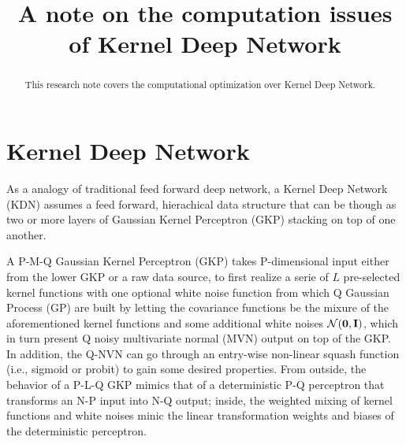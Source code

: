 \documentclass[11pt]{article}
\newcommand{\bs}{\boldsymbol}
\begin{document}
\title{A note on the computation issues of Kernel Deep Network}
\maketitle
{}

\clearpage
\begin{abstract}
  This research note covers the computational optimization over Kernel Deep Network.
\end{abstract}
\clearpage

\section{Kernel Deep Network}
As a analogy of traditional feed forward deep network, a Kernel Deep Network (KDN) assumes a feed forward, hierachical data structure that can be though as two or more layers of Gaussian Kernel Perceptron (GKP) stacking on top of one another.

A P-M-Q Gaussian Kernel Perceptron (GKP) takes P-dimensional input either from the lower GKP or a raw data source, to first realize a serie of $L$ pre-selected kernel functions with one optional white noise function from which Q Gaussian Process (GP) are built by letting the covariance functions be the mixure of the aforementioned kernel functions and some additional white noises $\mathcal{N}(\bs{0}, \textrm{\textbf{I}})$, which in turn present Q noisy multivariate normal (MVN) output on top of the GKP. In addition, the Q-NVN can go through an entry-wise non-linear squash function (i.e., sigmoid or probit) to gain some desired properties. From outside, the behavior of a P-L-Q GKP mimics that of a deterministic P-Q perceptron that transforms an N-P input into N-Q output; inside, the weighted mixing of kernel functions and white noises minic the linear transformation weights and biases of the deterministic perceptron.
\end{document}
